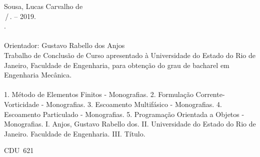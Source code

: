 \begin{titlepage}
\begin{center}
\begin{boxedminipage}{140mm}
{\begin{minipage}[top]{115mm}
		Sousa, Lucas Carvalho de\\
		\phantom{XX}\mainTitle\,/\,\authorName. -- 2019.\\
		\phantom{XX}\numPages.\\
		\phantom{XX}\\
		\phantom{XX}Orientador: Gustavo Rabello dos Anjos\\ \hspace*{5mm}
       		\phantom{XX}Trabalho de Conclusão de Curso apresentado à Universidade do Estado do Rio de Janeiro, Faculdade de Engenharia, para obtenção do grau de bacharel em Engenharia Mecânica.\\
		\phantom{XX}\\
		\phantom{XX}1. Método de Elementos Finitos - Monografias. 2. Formulação Corrente-Vorticidade - Monografias. 3. Escoamento Multifásico - Monografias. 4. Escoamento Particulado - Monografias. 5. Programação Orientada a Objetos - Monografias. I. Anjos, Gustavo Rabello dos. II. Universidade do Estado do Rio de Janeiro. Faculdade de Engenharia. III. Título.
	\end{minipage}}
	\vspace*{5mm}
	\begin{flushright}
	 CDU~621
	\end{flushright}
    \vspace{1mm}
	\end{boxedminipage}\\
	\end{center}
%
\end{titlepage}